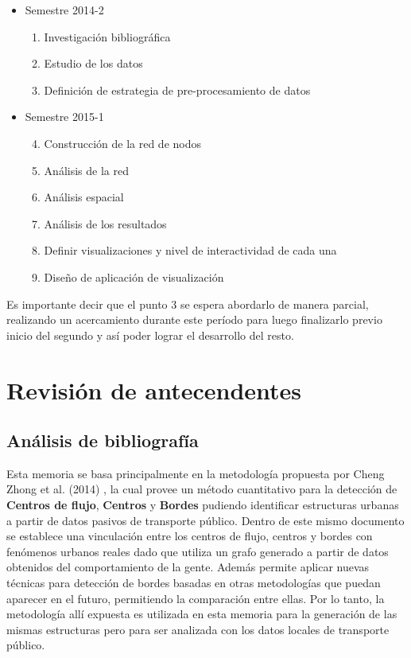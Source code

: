 \documentclass[12pt]{article}
\begin{document}
    \begin{itemize}
    \item Semestre 2014-2
    \begin{enumerate}
    \item Investigación bibliográfica 
    \item Estudio de los datos
    \item Definición de estrategia de pre-procesamiento de datos
    \end{enumerate}
    \item Semestre 2015-1
    \begin{enumerate}\setcounter{enumi}{3}
    \item Construcción de la red de nodos
    \item Análisis de la red
    \item Análisis espacial
    \item Análisis de los resultados
    \item Definir visualizaciones y nivel de interactividad de cada una
    \item Diseño de aplicación de visualización
    \end{enumerate}
    \end{itemize}

    Es importante decir que el punto 3 se espera abordarlo de manera parcial, realizando un acercamiento durante este período para luego finalizarlo previo inicio del segundo y así poder lograr el desarrollo del resto.


    \newpage

    \section{Revisión de antecendentes}
    
    \subsection{Análisis de bibliografía}\label{sec:Analisis_bibliografia}
    
    Esta memoria se basa principalmente en la metodología propuesta por Cheng Zhong et al. (2014) \cite{Estructura_urbana}, la cual provee un método cuantitativo para la detección de \textbf{Centros de flujo}, \textbf{Centros} y \textbf{Bordes} pudiendo identificar estructuras urbanas a partir de datos pasivos de transporte público. Dentro de este mismo documento se establece una vinculación entre los centros de flujo, centros y bordes con fenómenos urbanos reales dado que utiliza un grafo generado a partir de datos obtenidos del comportamiento de la gente. Además permite aplicar nuevas técnicas para detección de bordes basadas en otras metodologías que puedan aparecer en el futuro, permitiendo la comparación entre ellas. Por lo tanto, la metodología allí expuesta es utilizada en esta memoria para la generación de las mismas estructuras pero para ser analizada con los datos locales de transporte público.
    
\end{document}
